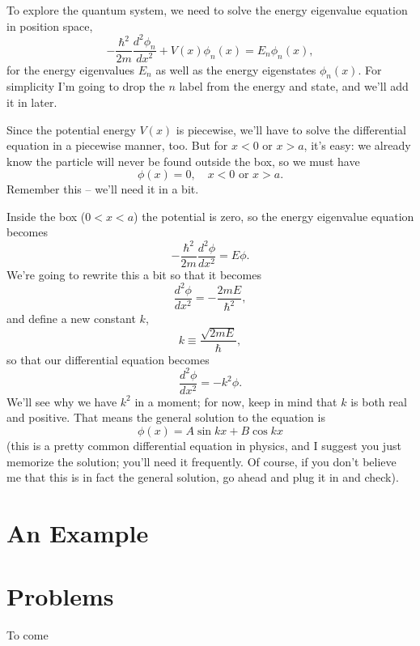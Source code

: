 To explore the quantum system, we need to solve the energy eigenvalue equation in position space,
\[
-\frac{\hbar^2}{2m} \frac{d^2 \phi_n}{dx^2} + V(x)\phi_n(x) = E_n \phi_n(x),
\]
for the energy eigenvalues $E_n$ as well as the energy eigenstates $\phi_n(x)$.  For simplicity I'm going to drop the $n$ label from the energy and state, and we'll add it in later.

Since the potential energy $V(x)$ is piecewise, we'll have to solve the differential equation in a piecewise manner, too.  But for $x<0$ or $x>a$, it's easy:  we already know the particle will never be found outside the box, so we must have
\begin{equation}
\phi(x) = 0, \quad x<0 \text{ or } x>a.
\end{equation}
Remember this -- we'll need it in a bit.

Inside the box ($0 < x < a$) the potential is zero, so the energy eigenvalue equation becomes 
\[
-\frac{\hbar^2}{2m} \frac{d^2 \phi}{dx^2} = E \phi.
\]
We're going to rewrite this a bit so that it becomes
\[
\frac{d^2 \phi}{dx^2} = -\frac{2mE}{\hbar^2},
\]
and define a new constant $k$,
\begin{equation}
k \equiv \frac{\sqrt{2mE}}{\hbar},
\end{equation}
so that our differential equation becomes
\[
\frac{d^2 \phi}{dx^2} = -k^2 \phi.
\]
We'll see why we have $k^2$ in a moment; for now, keep in mind that $k$ is both real and positive.  That means the general solution to the equation is 
\[
\phi(x) = A \sin kx + B \cos kx
\]
(this is a pretty common differential equation in physics, and I suggest you just memorize the solution; you'll need it frequently.  Of course, if you don't believe me that this is in fact the general solution, go ahead and plug it in and check).

\section{An Example}

%
%
%

\section*{Problems}
%

\begin{problem}[To come]
\label{prob_to_come}

To come

\end{problem}

